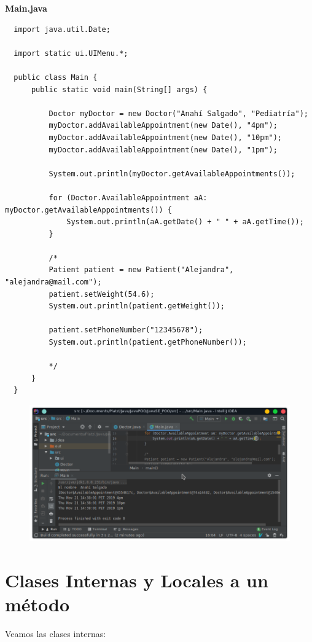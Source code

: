 \documentclass{article}
\begin{document}
\textbf{Main.java}
\begin{verbatim}
  import java.util.Date;

  import static ui.UIMenu.*;

  public class Main {
      public static void main(String[] args) {

          Doctor myDoctor = new Doctor("Anahí Salgado", "Pediatría");
          myDoctor.addAvailableAppointment(new Date(), "4pm");
          myDoctor.addAvailableAppointment(new Date(), "10pm");
          myDoctor.addAvailableAppointment(new Date(), "1pm");

          System.out.println(myDoctor.getAvailableAppointments());

          for (Doctor.AvailableAppointment aA: myDoctor.getAvailableAppointments()) {
              System.out.println(aA.getDate() + " " + aA.getTime());
          }

          /*
          Patient patient = new Patient("Alejandra", "alejandra@mail.com");
          patient.setWeight(54.6);
          System.out.println(patient.getWeight());

          patient.setPhoneNumber("12345678");
          System.out.println(patient.getPhoneNumber());

          */
      }
  }
\end{verbatim}

\begin{figure}[h!]
  \centering
  \includegraphics[scale=0.5]{./Pictures/041_foreach.png}
\end{figure}

\section{Clases Internas y Locales a un método}%

Veamos las clases internas:\\
\end{document}
